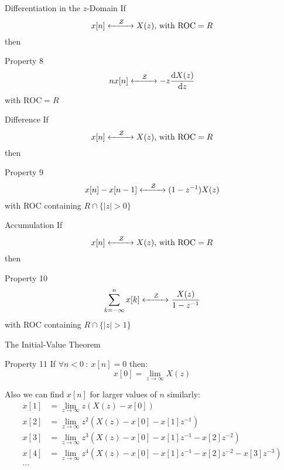 \documentclass[aspectratio=169]{beamer}
\begin{document}
\begin{frame}{Differentiation in the $ z $-Domain}
	If\\
	\[x[n] \xleftrightarrow[]{\quad\mathcal{Z}\quad} X(z) \text{, with } \mathrm{ROC} =R\]
	then
	\begin{block}{Property 8}
		\[ nx[n] \xleftrightarrow[]{\quad\mathcal{Z}\quad} -z\dfrac{\mathrm{d}X(z)}{\mathrm{d}z} \]
		\centering
		with $\mathrm{ROC} = R $
	\end{block}
\end{frame}

\begin{frame}{Difference}
	If\\
	\[x[n] \xleftrightarrow[]{\quad\mathcal{Z}\quad} X(z) \text{, with } \mathrm{ROC} =R\]
	then
	\begin{block}{Property 9}
		\[ x[n]-x[n-1] \xleftrightarrow[]{\quad\mathcal{Z}\quad} (1-z^{-1})X(z) \]
		\centering
		with ROC containing $R\cap\{|z|>0\}$
	\end{block}
\end{frame}

\begin{frame}{Accumulation}
	If\\
	\[x[n] \xleftrightarrow[]{\quad\mathcal{Z}\quad} X(z) \text{, with } \mathrm{ROC} =R\]
	then
	\begin{block}{Property 10}
		\[ \sum_{k=-\infty}^{n}x[k] \xleftrightarrow[]{\quad\mathcal{Z}\quad} \dfrac{X(z)}{1-z^{-1}} \]
		\centering
		with ROC containing $R\cap\{|z|>1\}$
	\end{block}
\end{frame}

\begin{frame}{The Initial-Value Theorem}
	\begin{block}{Property 11}
			If 	$ \forall n<0\: : \: x[n]=0 $	then:
		\[	x[0] = \lim\limits_{z\to\infty}X(z)\]
	\end{block}
	Also we can find $ x[n] $ for larger values of $ n $ similarly:
	\[\begin{aligned}
	x[1] &= \lim\limits_{z\to\infty}z\left(X(z)-x[0]\right)\\
	x[2] &= \lim\limits_{z\to\infty}z^2\left(X(z)-x[0]-x[1]z^{-1}\right)\\
	x[3] &= \lim\limits_{z\to\infty}z^3\left(X(z)-x[0]-x[1]z^{-1}-x[2]z^{-2}\right)\\
	x[4] &= \lim\limits_{z\to\infty}z^4\left(X(z)-x[0]-x[1]z^{-1}-x[2]z^{-2}-x[3]z^{-3}\right)\\
	\dots & 
	\end{aligned}\]
\end{frame}
\end{document}
